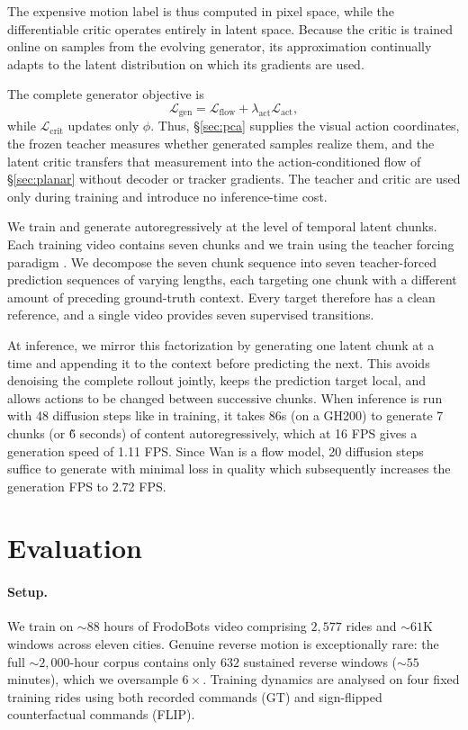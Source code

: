 \documentclass[letterpaper]{article} %
\begin{document}
The expensive motion label is thus computed in pixel space, while the
differentiable critic operates entirely in latent space. Because the critic
is trained online on samples from the evolving generator, its approximation
continually adapts to the latent distribution on which its gradients are
used.

The complete generator objective is
\begin{equation}
    \mathcal{L}_{\mathrm{gen}}
    =
    \mathcal{L}_{\mathrm{flow}}
    +
    \lambda_{\mathrm{act}}
    \mathcal{L}_{\mathrm{act}},
    \label{eq:generator_objective}
\end{equation}
while $\mathcal{L}_{\mathrm{crit}}$ updates only $\phi$. Thus,
\S\ref{sec:pca} supplies the visual action coordinates, the frozen teacher
measures whether generated samples realize them, and the latent critic
transfers that measurement into the action-conditioned flow of
\S\ref{sec:planar} without decoder or tracker gradients. The teacher and
critic are used only during training and introduce no inference-time cost.

We train and generate autoregressively at the level of temporal latent chunks.
Each training video contains seven chunks and we train using the teacher forcing paradigm \cite{williams1989learning}. We decompose the seven chunk sequence into seven teacher-forced prediction sequences of varying lengths, each targeting one chunk with a different
amount of preceding ground-truth context. Every target therefore has a clean
reference, and a single video provides seven supervised transitions.

At inference, we mirror this factorization by generating one latent chunk at
a time and appending it to the context before predicting the next. This avoids
denoising the complete rollout jointly, keeps the prediction target local, and
allows actions to be changed between successive chunks. When inference is run with 48 diffusion steps like in training, it takes 86s (on a GH200) to generate 7 chunks (or \~6 seconds) of content autoregressively, which at 16 FPS gives a generation speed of 1.11 FPS. Since Wan is a flow model, 20 diffusion steps suffice to generate with minimal loss in quality which subsequently increases the generation FPS to 2.72 FPS.  

\section{Evaluation}
\label{sec:eval}

\paragraph{Setup.}
We train on ${\sim}88$ hours of FrodoBots video comprising $2{,}577$ rides and ${\sim}61$K windows across eleven cities. Genuine reverse motion is exceptionally rare: the full ${\sim}2{,}000$-hour corpus contains only $632$ sustained reverse windows (${\sim}55$ minutes), which we oversample $6\times$. Training dynamics are analysed on four fixed training rides using both recorded commands (GT) and sign-flipped counterfactual commands (FLIP).
\end{document}
